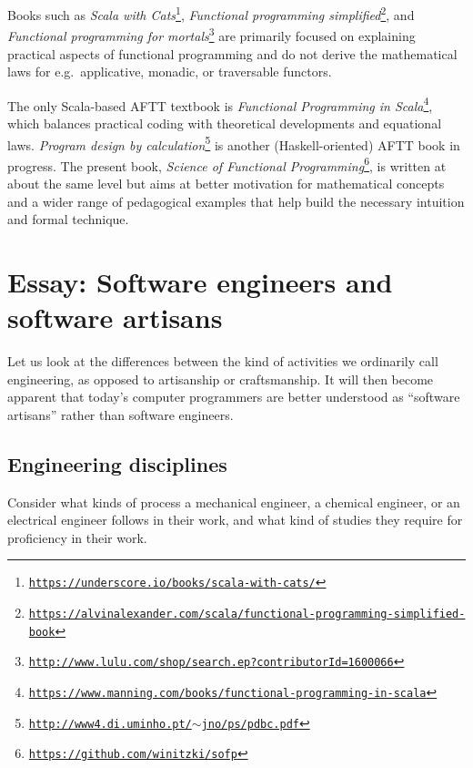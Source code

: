 Books such as \emph{Scala with Cats}\footnote{\texttt{\href{https://underscore.io/books/scala-with-cats/}{https://underscore.io/books/scala-with-cats/}}},
\emph{Functional programming simplified}\footnote{\texttt{\href{https://alvinalexander.com/scala/functional-programming-simplified-book}{https://alvinalexander.com/scala/functional-programming-simplified-book}}},
and \emph{Functional programming for mortals}\footnote{\texttt{\href{http://www.lulu.com/shop/search.ep?contributorId=1600066}{http://www.lulu.com/shop/search.ep?contributorId=1600066}}}
are primarily focused on explaining practical aspects of functional
programming and do not derive the mathematical laws for e.g.~applicative,
monadic, or traversable functors.

The only Scala-based AFTT textbook is \emph{Functional Programming
in Scala}\footnote{\texttt{\href{https://www.manning.com/books/functional-programming-in-scala}{https://www.manning.com/books/functional-programming-in-scala}}},
which balances practical coding with theoretical developments and
equational laws. \emph{Program design by calculation}\footnote{\texttt{\href{http://www4.di.uminho.pt/~jno/ps/pdbc.pdf}{http://www4.di.uminho.pt/$\sim$jno/ps/pdbc.pdf}}}
is another (Haskell-oriented) AFTT book in progress. The present book,
\emph{Science of Functional Programming}\footnote{\texttt{\href{https://github.com/winitzki/sofp}{https://github.com/winitzki/sofp}}},
is written at about the same level but aims at better motivation for
mathematical concepts and a wider range of pedagogical examples that
help build the necessary intuition and formal technique. 

\chapter{Essay: Software engineers and software artisans}

Let us look at the differences between the kind of activities we ordinarily
call engineering, as opposed to artisanship or craftsmanship. It will
then become apparent that today's computer programmers are better
understood as ``software artisans'' rather than software engineers.

\section{Engineering disciplines }

Consider what kinds of process a mechanical engineer, a chemical engineer,
or an electrical engineer follows in their work, and what kind of
studies they require for proficiency in their work.

